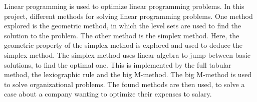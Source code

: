
Linear programming is used to optimize linear programming problems. In this project, different methods for solving linear programming problems. One method explored is the geometric method, in which the level sets are used to find the solution to the problem. The other method is the simplex method. Here, the geometric property of the simplex method is explored and used to deduce the simplex method. The simplex method uses linear algebra to jump between basic solutions, to find the optimal one. This is implemented by the full tabular method, the lexiographic rule and the big M-method. The big M-method is used to solve organizational problems. The found methods are then used, to solve a case about a company wanting to optimize their expenses to salary. 